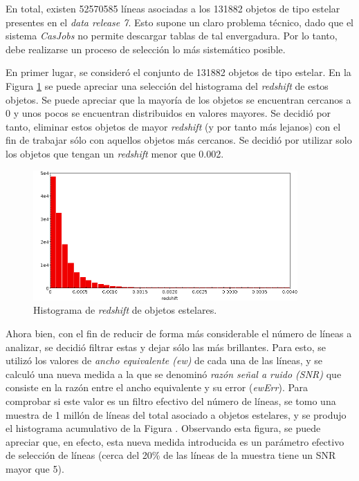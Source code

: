 En total, existen 52570585 líneas asociadas a los 131882 objetos de tipo estelar presentes en el \textit{data release 7}. Esto supone un claro problema técnico, dado que el sistema \textit{CasJobs} no permite descargar tablas de tal envergadura. Por lo tanto, debe realizarse un proceso de selección lo más sistemático posible. 

En primer lugar, se consideró el conjunto de 131882 objetos de tipo estelar. En la Figura \ref{fig:stelar_obj_redshift} se puede apreciar una selección del histograma del \textit{redshift} de estos objetos. Se puede apreciar que la mayoría de los objetos se encuentran cercanos a 0 y unos pocos se encuentran distribuidos en valores mayores. Se decidió por tanto, eliminar estos objetos de mayor \textit{redshift} (y por tanto más lejanos) con el fin de trabajar sólo con aquellos objetos más cercanos. Se decidió por utilizar solo los objetos que tengan un \textit{redshift} menor que 0.002.

\begin{figure}[h!]
\begin{center}
\includegraphics[width=0.9\textwidth]{imagenes/stelar_obj_redshift_hist.png}
\end{center}
\vspace*{-5mm}
\caption{Histograma de \textit{redshift} de objetos estelares.}
\label{fig:stelar_obj_redshift}
\end{figure}

Ahora bien, con el fin de reducir de forma más considerable el número de líneas a analizar, se decidió filtrar estas y dejar sólo las más brillantes. Para esto, se utilizó los valores de \textit{ancho equivalente (ew)} de cada una de las líneas, y se calculó una nueva medida a la que se denominó \textit{razón señal a ruido (SNR)} que consiste en la razón entre el ancho equivalente y su error (\textit{ewErr}). Para comprobar si este valor es un filtro efectivo del número de líneas, se tomo una muestra de 1 millón de líneas del total asociado a objetos estelares, y se produjo el histograma acumulativo de la Figura \label{fig:stelar_obj_snr}. Observando esta figura, se puede apreciar que, en efecto, esta nueva medida introducida es un parámetro efectivo de selección de líneas (cerca del 20\% de las líneas de la muestra tiene un SNR mayor que 5).

